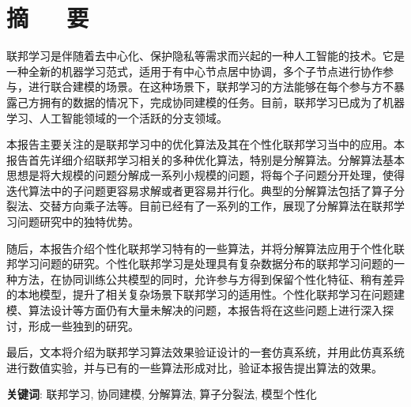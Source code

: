 \chapter*{摘~~~要}
\headheight=15.24pt%

\setcounter{page}{1}


联邦学习是伴随着去中心化、保护隐私等需求而兴起的一种人工智能的技术。它是一种全新的机器学习范式，适用于有中心节点居中协调，多个子节点进行协作参与，进行联合建模的场景。在这种场景下，联邦学习的方法能够在每个参与方不暴露己方拥有的数据的情况下，完成协同建模的任务。目前，联邦学习已成为了机器学习、人工智能领域的一个活跃的分支领域。

本报告主要关注的是联邦学习中的优化算法及其在个性化联邦学习当中的应用。本报告首先详细介绍联邦学习相关的多种优化算法，特别是分解算法。分解算法基本思想是将大规模的问题分解成一系列小规模的问题，将每个子问题分开处理，使得迭代算法中的子问题更容易求解或者更容易并行化。典型的分解算法包括了算子分裂法、交替方向乘子法等。目前已经有了一系列的工作，展现了分解算法在联邦学习问题研究中的独特优势。

随后，本报告介绍个性化联邦学习特有的一些算法，并将分解算法应用于个性化联邦学习问题的研究。个性化联邦学习是处理具有复杂数据分布的联邦学习问题的一种方法，在协同训练公共模型的同时，允许参与方得到保留个性化特征、稍有差异的本地模型，提升了相关复杂场景下联邦学习的适用性。个性化联邦学习在问题建模、算法设计等方面仍有大量未解决的问题，本报告将在这些问题上进行深入探讨，形成一些独到的研究。

最后，文本将介绍为联邦学习算法效果验证设计的一套仿真系统，并用此仿真系统进行数值实验，并与已有的一些算法形成对比，验证本报告提出算法的效果。

\par
\bigskip

{\song \textbf{关键词}: 联邦学习, 协同建模, 分解算法, 算子分裂法, 模型个性化}

